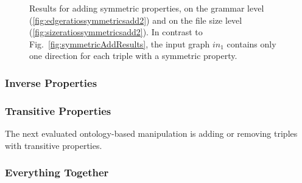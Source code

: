 \begin{figure}[h]
	\centering
	\hfill 
	\caption{Results for adding symmetric properties, on the grammar level (\ref{fig:edgeratiossymmetricsadd2}) and on the file size level (\ref{fig:sizeratiossymmetricsadd2}). In contrast to Fig.~\ref{fig:symmetricAddResults}, the input graph $in_1$ contains only one direction for each triple with a symmetric property.}
	\label{fig:symmetricAddResults2}
\end{figure}


\subsubsection{Inverse Properties}

\subsubsection{Transitive Properties}

The next evaluated ontology-based manipulation is adding or removing triples with transitive properties. 

\subsubsection{Everything Together}

